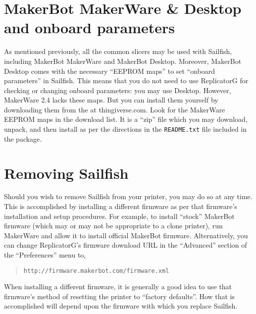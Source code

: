 
\section{MakerBot MakerWare \& Desktop and onboard parameters} \label{sec:makerware}

As mentioned previously, all the common \glspl{slicer} may be used with
Sailfish, including MakerBot MakerWare and MakerBot Desktop.  Moreover,
MakerBot Desktop comes with the necessary ``EEPROM maps'' to set ``onboard
parameters'' in Sailfish.  This means that you do not need to use ReplicatorG
for checking or changing onboard parameters: you may use Desktop.  However,
MakerWare 2.4 lacks these maps.  But you can install them yourself by
downloading them from the
at thingiverse.com.  Look for the MakerWare EEPROM maps in the download list.
It is a ``zip'' file which you may download, unpack, and then install as per
the directions in the \texttt{README.txt} file included in the package.


\section{Removing Sailfish}

Should you wish to remove Sailfish from your printer, you may do so at
any time.  This is accomplished by installing a different firmware as
per that firmware's installation and setup procedures.  For example,
to install ``stock'' MakerBot firmware (which may or may not be
appropriate to a clone printer), run MakerWare and allow it
to install official MakerBot firmware.  Alternatively, you can change
ReplicatorG's firmware download URL in the ``Advanced'' section of
the ``Preferences'' menu to,
\begin{quote}
{\smaller\texttt{http://firmware.makerbot.com/firmware.xml}}
\end{quote}
When installing a different firmware, it is generally a good idea to use
that firmware's method of resetting the printer to ``factory defaults''.  How
that is accomplished will depend upon the firmware with which you replace Sailfish.
